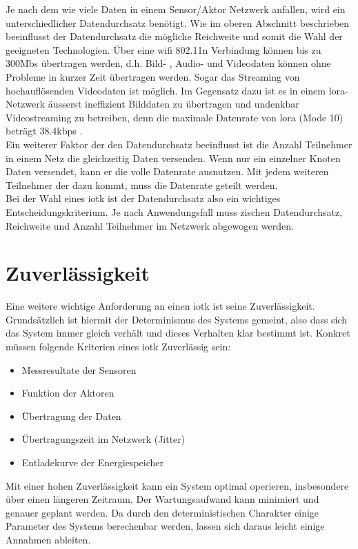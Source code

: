 Je nach dem wie viele Daten in einem Sensor/Aktor Netzwerk anfallen, wird ein unterschiedlicher Datendurchsatz benötigt. Wie im oberen Abschnitt beschrieben beeinflusst der Datendurchsatz die mögliche Reichweite und somit die Wahl der geeigneten Technologien. Über eine \gls{wifi} 802.11n Verbindung können bis zu 300Mbs übertragen werden, d.h. Bild- , Audio- und Videodaten können ohne Probleme in kurzer Zeit übertragen werden. Sogar das Streaming von hochauflösenden Videodaten ist möglich. Im Gegensatz dazu ist es in einem \gls{lora}-Netzwerk äusserst ineffizient Bilddaten zu übertragen und undenkbar Videostreaming zu betreiben, denn die maximale Datenrate von \gls{lora} (Mode 10) beträgt 38.4kbps \autocite[2]{lora:FAQ}.\\
Ein weiterer Faktor der den Datendurchsatz beeinflusst ist die Anzahl Teilnehmer in einem Netz die gleichzeitig Daten versenden. Wenn nur ein einzelner Knoten Daten versendet, kann er die volle Datenrate ausnutzen. Mit jedem weiteren Teilnehmer der dazu kommt, muss die Datenrate geteilt werden.\\
Bei der Wahl eines \gls{iotk} ist der Datendurchsatz also ein wichtiges Entscheidungskriterium. Je nach Anwendungsfall muss zischen Datendurchsatz, Reichweite und Anzahl Teilnehmer im Netzwerk abgewogen werden.

\section{Zuverlässigkeit}

Eine weitere wichtige Anforderung an einen \gls{iotk} ist seine Zuverlässigkeit. Grundsätzlich ist hiermit der Determinismus des Systems gemeint, also dass sich das System immer gleich verhält und dieses Verhalten klar bestimmt ist. Konkret müssen folgende Kriterien eines \gls{iotk} Zuverlässig sein:
\begin{itemize}  
  \item Messresultate der Sensoren
  \item Funktion der Aktoren
  \item Übertragung der Daten
  \item Übertragungszeit im Netzwerk (Jitter)
  \item Entladekurve der Energiespeicher
\end{itemize}

Mit einer hohen Zuverlässigkeit kann ein System optimal operieren, insbesondere über einen längeren Zeitraum. Der Wartungsaufwand kann minimiert und genauer geplant werden. Da durch den deterministischen Charakter einige Parameter des Systems berechenbar werden, lassen sich daraus leicht einige Annahmen ableiten.

